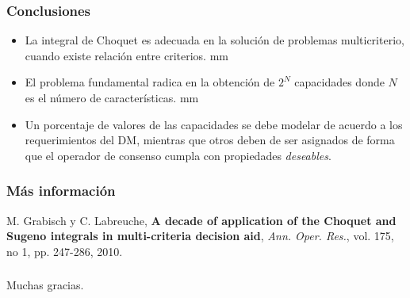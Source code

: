 \documentclass{beamer}
\theoremstyle{definition}
\begin{document}
\begin{frame}
  \frametitle{Conclusiones}
  \begin{itemize}
  \item La integral de Choquet es adecuada en la solución de problemas multicriterio,
    cuando existe relación entre criterios.  
     mm
  \item El problema fundamental radica en la obtención de $2^N$
    capacidades donde $N$ es el número de características. 
     mm   
  \item Un porcentaje de valores de las capacidades se debe modelar de
    acuerdo a los requerimientos del DM, mientras que otros deben de
    ser asignados de forma que el operador de consenso cumpla con
    propiedades \emph{deseables}.
  \end{itemize}
\end{frame}

\begin{frame}
  \frametitle{Más información}

   \begin{thebibliography}{12}

     \beamertemplatearticlebibitems
     
     M. Grabisch y C. Labreuche, 
     \newblock \textbf{A decade of application of the Choquet and Sugeno
     integrals in multi-criteria decision aid}, 
     \newblock \emph{Ann. Oper. Res.}, vol. 175, no 1, pp. 247-286, 2010.
   \end{thebibliography}
 \end{frame}

 \begin{frame}
   \frametitle{ }
   \begin{center}
     \Huge{Muchas gracias.}
   \end{center}
 \end{frame}
 
 
\end{document}

